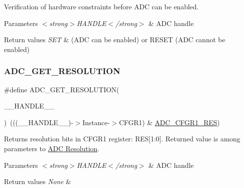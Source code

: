 Verification of hardware constraints before A\+DC can be enabled. 


\begin{DoxyParams}{Parameters}
{\em $<$strong$>$\+H\+A\+N\+D\+L\+E$<$/strong$>$} & A\+DC handle \\
\hline
\end{DoxyParams}

\begin{DoxyRetVals}{Return values}
{\em S\+ET} & (A\+DC can be enabled) or R\+E\+S\+ET (A\+DC cannot be enabled) \\
\hline
\end{DoxyRetVals}
\mbox{\label{group___a_d_c___private___macros_gae2da95074db4dd0418c1dd1f13ad7970}} 
\subsubsection{\texorpdfstring{A\+D\+C\+\_\+\+G\+E\+T\+\_\+\+R\+E\+S\+O\+L\+U\+T\+I\+ON}{ADC\_GET\_RESOLUTION}}
{\footnotesize\ttfamily \#define A\+D\+C\+\_\+\+G\+E\+T\+\_\+\+R\+E\+S\+O\+L\+U\+T\+I\+ON(\begin{DoxyParamCaption}\item[{}]{\+\_\+\+\_\+\+H\+A\+N\+D\+L\+E\+\_\+\+\_\+ }\end{DoxyParamCaption})~(((\+\_\+\+\_\+\+H\+A\+N\+D\+L\+E\+\_\+\+\_\+)-\/$>$Instance-\/$>$C\+F\+G\+R1) \& \hyperlink{group___peripheral___registers___bits___definition_ga9d5676c559f66561a86e6236ba803f98}{A\+D\+C\+\_\+\+C\+F\+G\+R1\+\_\+\+R\+ES})}



Returns resolution bits in C\+F\+G\+R1 register\+: R\+ES\mbox{[}1\+:0\mbox{]}. Returned value is among parameters to \hyperlink{group___a_d_c___resolution}{A\+DC Resolution}. 


\begin{DoxyParams}{Parameters}
{\em $<$strong$>$\+H\+A\+N\+D\+L\+E$<$/strong$>$} & A\+DC handle \\
\hline
\end{DoxyParams}

\begin{DoxyRetVals}{Return values}
{\em None} & \\
\hline
\end{DoxyRetVals}
\mbox{\label{group___a_d_c___private___macros_ga2fcb55eda590a2037a99af8d594460b7}} 

